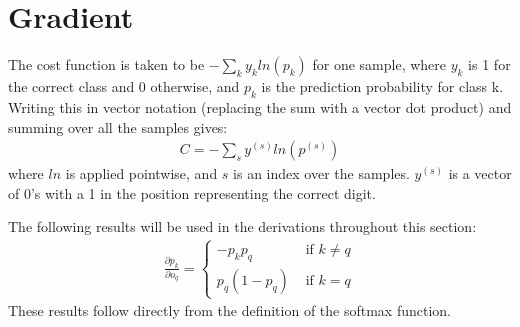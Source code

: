 \documentclass{article}
\begin{document}
   \section{Gradient}
   The cost function is taken to be $- \sum_{k} y_k ln(p_k)$ for one sample, where $y_k$ is
   1 for the correct class and 0 otherwise, and $p_k$ is the prediction probability for class k.
   Writing this in vector notation (replacing the sum with a vector dot product) and
   summing over all the samples gives:
      \begin{equation*} \begin{split}
         C = - \sum_{s} y^{(s)} ln(p^{(s)})
      \end{split} \end{equation*}
   where $ln$ is applied pointwise, and $s$ is an index over the samples. $y^{(s)}$ is
   a vector of 0's with a 1 in the position representing the correct digit.

   The following results will be used in the derivations throughout this section:
      \begin{equation*} \begin{split}
        \frac{ \partial p_k}{ \partial o_q } =
            \begin{cases}
               -p_k p_q       & \textrm{ if } k \neq q \\
               p_q (1 - p_q)  & \textrm{ if } k = q
            \end{cases}
      \end{split} \end{equation*}
   These results follow directly from the definition of the softmax function.
\end{document}
